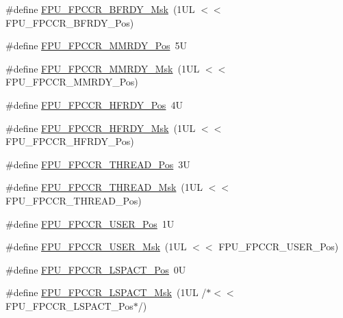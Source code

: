 \begin{DoxyCompactItemize}
\#define \mbox{\hyperlink{group___c_m_s_i_s___f_p_u_gad349eb1323d8399d54a04c0bfd520cb2}{F\+P\+U\+\_\+\+F\+P\+C\+C\+R\+\_\+\+B\+F\+R\+D\+Y\+\_\+\+Msk}}~(1\+U\+L $<$$<$ F\+P\+U\+\_\+\+F\+P\+C\+C\+R\+\_\+\+B\+F\+R\+D\+Y\+\_\+\+Pos)
\item 
\#define \mbox{\hyperlink{group___c_m_s_i_s___f_p_u_gaccdb481211629f9440431439231187f1}{F\+P\+U\+\_\+\+F\+P\+C\+C\+R\+\_\+\+M\+M\+R\+D\+Y\+\_\+\+Pos}}~5U
\item 
\#define \mbox{\hyperlink{group___c_m_s_i_s___f_p_u_gadedfaec9fdd07261573e823a4dcfb5c4}{F\+P\+U\+\_\+\+F\+P\+C\+C\+R\+\_\+\+M\+M\+R\+D\+Y\+\_\+\+Msk}}~(1\+U\+L $<$$<$ F\+P\+U\+\_\+\+F\+P\+C\+C\+R\+\_\+\+M\+M\+R\+D\+Y\+\_\+\+Pos)
\item 
\#define \mbox{\hyperlink{group___c_m_s_i_s___f_p_u_gab12733991487acc2da41ca300fe36fb6}{F\+P\+U\+\_\+\+F\+P\+C\+C\+R\+\_\+\+H\+F\+R\+D\+Y\+\_\+\+Pos}}~4U
\item 
\#define \mbox{\hyperlink{group___c_m_s_i_s___f_p_u_gaf4beaa279abff34828344bd594fff8a1}{F\+P\+U\+\_\+\+F\+P\+C\+C\+R\+\_\+\+H\+F\+R\+D\+Y\+\_\+\+Msk}}~(1\+U\+L $<$$<$ F\+P\+U\+\_\+\+F\+P\+C\+C\+R\+\_\+\+H\+F\+R\+D\+Y\+\_\+\+Pos)
\item 
\#define \mbox{\hyperlink{group___c_m_s_i_s___f_p_u_ga0937d64c42374200af44b22e5b49fd26}{F\+P\+U\+\_\+\+F\+P\+C\+C\+R\+\_\+\+T\+H\+R\+E\+A\+D\+\_\+\+Pos}}~3U
\item 
\#define \mbox{\hyperlink{group___c_m_s_i_s___f_p_u_ga8d18cd88336d63d4b1810383aa8da700}{F\+P\+U\+\_\+\+F\+P\+C\+C\+R\+\_\+\+T\+H\+R\+E\+A\+D\+\_\+\+Msk}}~(1\+U\+L $<$$<$ F\+P\+U\+\_\+\+F\+P\+C\+C\+R\+\_\+\+T\+H\+R\+E\+A\+D\+\_\+\+Pos)
\item 
\#define \mbox{\hyperlink{group___c_m_s_i_s___f_p_u_gaea663104375ce6be15470e3db294c92d}{F\+P\+U\+\_\+\+F\+P\+C\+C\+R\+\_\+\+U\+S\+E\+R\+\_\+\+Pos}}~1U
\item 
\#define \mbox{\hyperlink{group___c_m_s_i_s___f_p_u_ga2eb70427eeaa7344196219cf5a8620a4}{F\+P\+U\+\_\+\+F\+P\+C\+C\+R\+\_\+\+U\+S\+E\+R\+\_\+\+Msk}}~(1\+U\+L $<$$<$ F\+P\+U\+\_\+\+F\+P\+C\+C\+R\+\_\+\+U\+S\+E\+R\+\_\+\+Pos)
\item 
\#define \mbox{\hyperlink{group___c_m_s_i_s___f_p_u_ga803bf3f6d15b04deaad0801bee5b35ed}{F\+P\+U\+\_\+\+F\+P\+C\+C\+R\+\_\+\+L\+S\+P\+A\+C\+T\+\_\+\+Pos}}~0U
\item 
\#define \mbox{\hyperlink{group___c_m_s_i_s___f_p_u_ga86e7c2fa52ba65c3b535dfa33f2586eb}{F\+P\+U\+\_\+\+F\+P\+C\+C\+R\+\_\+\+L\+S\+P\+A\+C\+T\+\_\+\+Msk}}~(1\+U\+L /$\ast$$<$$<$ F\+P\+U\+\_\+\+F\+P\+C\+C\+R\+\_\+\+L\+S\+P\+A\+C\+T\+\_\+\+Pos$\ast$/)
$$
\end{DoxyCompactItemize}
